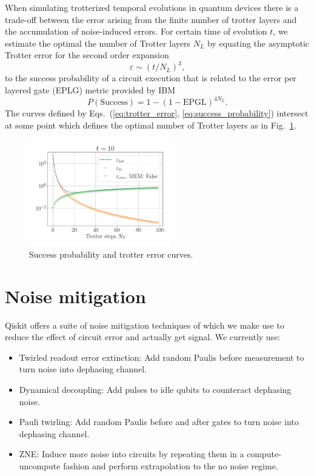 \documentclass[a4paper]{article}
\begin{document}
When simulating trotterized temporal evolutions in quantum devices there is a trade-off between the error arising from the finite number of trotter layers and the accumulation of noise-induced errors. For certain time of evolution $t$, we estimate the optimal the number of Trotter layers $N_L$ by equating the asymptotic Trotter error for the second order expansion
%
\begin{equation}
    \varepsilon \sim (t/N_L)^3,
    \label{eq:trotter_error}
\end{equation}
%
to the success probability of a circuit execution that is related to the error per layered gate (EPLG) metric provided by IBM \cite{mckay2023benchmarkingquantumprocessorperformance}
%
\begin{equation}
    P(\mathrm{Success}) = 1 - (1-\text{EPGL})^{4 N_L}.
    \label{eq:success_probability}
\end{equation}
%
The curves defined by Eqs.~(\ref{eq:trotter_error}, \ref{eq:success_probability}) intersect at some point which defines the optimal number of Trotter layers as in Fig.~\ref{fig:optimal_layers}.

\begin{figure}
    \centering
    \includegraphics[width=0.55\textwidth]{optimal_trotter.pdf}
    \caption{Success probability and trotter error curves.}
    \label{fig:optimal_layers}
\end{figure}

\section{Noise mitigation}

Qiskit offers a suite of noise mitigation techniques of which we make use to reduce the effect of circuit error and actually get signal. We currently use:

\begin{itemize}
    \item Twirled readout error extinction: Add random Paulis before measurement to turn noise into dephasing channel.
    \item Dynamical decoupling: Add pulses to idle qubits to counteract dephasing noise.
    \item Pauli twirling: Add random Paulis before and after gates to turn noise into dephasing channel.
    \item ZNE: Induce more noise into circuits by repeating them in a compute-uncompute fashion and perform extrapolation to the no noise regime.
\end{itemize}
\end{document}

